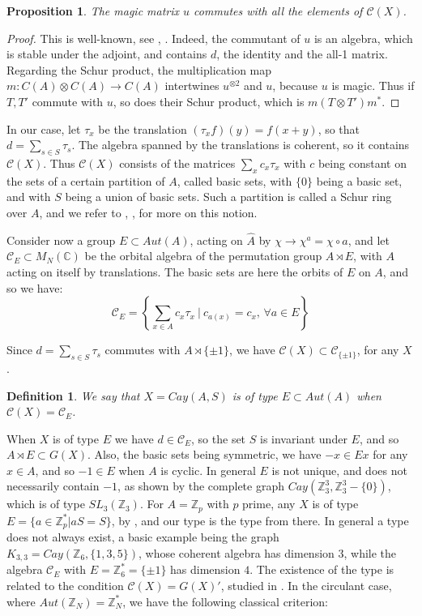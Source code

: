 \documentclass[11pt]{amsart}
\newtheorem{proposition}[theorem]{Proposition}
\newtheorem{definition}[theorem]{Definition}
\newcommand{\C}{\mathcal C}
\newcommand{\Z}{\mathbb Z}
\newcommand{\CC}{\mathbb C}
\newcommand{\hA}{\widehat A}
\begin{document}
\begin{proposition}
The magic matrix $u$ commutes with all the elements of $\C(X)$.
\end{proposition}

\begin{proof}
This is well-known, see \cite{ba2}, \cite{lmr}. Indeed, the commutant of $u$ is an algebra, which is stable under the adjoint, and contains $d$, the identity and the all-1 matrix. Regarding the Schur product, the multiplication map $m:C(A)\otimes C(A)\to C(A)$ intertwines $u^{\otimes 2}$ and $u$, because $u$ is magic. Thus if $T,T'$ commute with $u$, so does their Schur product, which is $m(T\otimes T')m^*$.
\end{proof}

In our case, let $\tau_x$ be the translation $(\tau_xf)(y)=f(x+y)$, so that $d=\sum_{s\in S}\tau_s$. The algebra spanned by the translations is coherent, so it contains $\C(X)$. Thus $\C(X)$ consists of the matrices $\sum_xc_x\tau_x$ with $c$ being constant on the sets of a certain partition of $A$, called basic sets, with $\{0\}$ being a basic set, and with $S$ being a union of basic sets. Such a partition is called a Schur ring over $A$, and we refer to \cite{ep}, \cite{lm1}, \cite{lm2} for more on this notion.

Consider now a group $E\subset Aut(A)$, acting on $\hA$ by $\chi\to\chi^a=\chi\circ a$, and let $\C_E\subset M_N(\CC)$ be the orbital algebra of the permutation group $A\rtimes E$, with $A$ acting on itself by translations. The basic sets are here the orbits of $E$ on $A$, and so we have:
$$\C_E=\left\{\sum_{x\in A}c_x\tau_x\ \Big|\ c_{a(x)}=c_x,\,\forall a\in E\right\}$$

Since $d=\sum_{s\in S}\tau_s$ commutes with $A\rtimes\{\pm1\}$, we have $\C(X)\subset\C_{\{\pm1\}}$, for any $X$.

\begin{definition}
We say that $X=Cay(A,S)$ is of type $E\subset Aut(A)$ when $\C(X)=\C_E$.
\end{definition}

When $X$ is of type $E$ we have $d\in\C_E$, so the set $S$ is invariant under $E$, and so $A\rtimes E\subset G(X)$. Also, the basic sets being symmetric, we have $-x\in Ex$ for any $x\in A$, and so $-1\in E$ when $A$ is cyclic. In general $E$ is not unique, and does not necessarily contain $-1$, as shown by the complete graph $Cay(\Z_3^3,\Z_3^3-\{0\})$, which is of type $SL_3(\Z_3)$. For $A=\Z_p$ with $p$ prime, any $X$ is of type $E=\{a\in\Z_p^*|aS=S\}$, by \cite{bbc}, and our type is the type from there. In general a type does not always exist, a basic example being the graph $K_{3,3}=Cay(\Z_6,\{1,3,5\})$, whose coherent algebra has dimension $3$, while the algebra $\C_E$ with $E=\Z_6^*=\{\pm1\}$ has dimension $4$. The existence of the type is related to the condition $\C(X)=G(X)'$, studied in \cite{cha}. In the circulant case, where $Aut(\Z_N)=\Z_N^*$, we have the following classical criterion:
\end{document}
